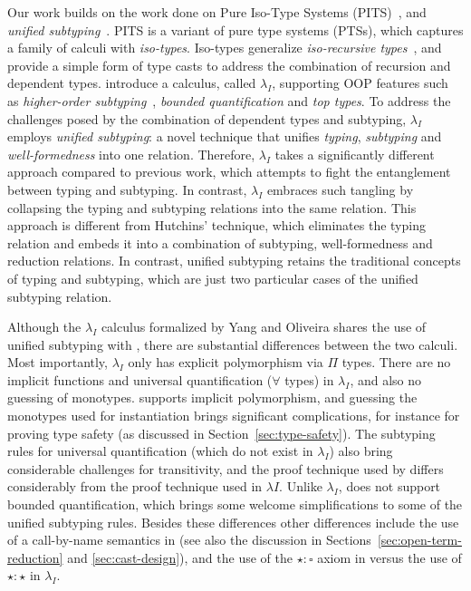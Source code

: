Our work builds on the work done on Pure Iso-Type Systems (PITS)~\citep{yang2019pure}, and
\emph{unified subtyping}~\citep{full}. PITS is a variant of pure type systems (PTSs),
which captures a family of calculi with \emph{iso-types}.
Iso-types generalize \emph{iso-recursive
types}~\citep{tapl}, and provide a simple form of
type casts to address the combination of recursion and
dependent types.
\cite{full} introduce a calculus, called $\lambda_{I}$, supporting OOP features such as
\emph{higher-order subtyping}~\citep{fsubo}, \emph{bounded quantification} and
\emph{top types}.
To address the challenges posed by
the combination of dependent types and subtyping, $\lambda_{I}$
employs \emph{unified subtyping}: a novel technique that unifies
\emph{typing}, \emph{subtyping} and \emph{well-formedness} into one
relation. Therefore, $\lambda_{I}$ takes a significantly different
approach compared to previous work, which
attempts to fight the entanglement between typing and subtyping. In
contrast, $\lambda_{I}$ embraces such
tangling by collapsing the typing and subtyping
relations into the same relation. This approach is different from
Hutchins' technique, which eliminates the typing relation and embeds it into
a combination of subtyping, well-formedness and reduction relations.
In contrast, unified subtyping
retains the traditional concepts of typing and subtyping, which are just two
particular cases of the unified subtyping relation.

Although the $\lambda_{I}$ calculus formalized by Yang and Oliveira shares the use
of unified subtyping with \name, there are substantial differences between the two calculi.
Most importantly, $\lambda_{I}$ only has explicit polymorphism via $\Pi$ types. There
are no implicit functions and universal quantification ($\forall$ types) in $\lambda_{I}$,
and also no guessing of monotypes. \name supports implicit polymorphism, and
guessing the monotypes used for instantiation brings significant complications, for instance
for proving type safety (as discussed in Section~\ref{sec:type-safety}).
The subtyping rules for universal quantification (which do not exist in $\lambda_{I}$) also
bring considerable challenges for transitivity, and the proof technique used by
\name differs considerably from the proof technique used in $\lambda{I}$.
Unlike $\lambda_{I}$, \name does not support bounded quantification, which brings
some welcome simplifications to some of the unified subtyping rules.
Besides these differences other differences include the use of a call-by-name
semantics in \name (see also the discussion in Sections~\ref{sec:open-term-reduction} and \ref{sec:cast-design}),
and the use of the $\star : \square$ axiom in \name versus the use of $\star : \star$
in $\lambda_{I}$.

